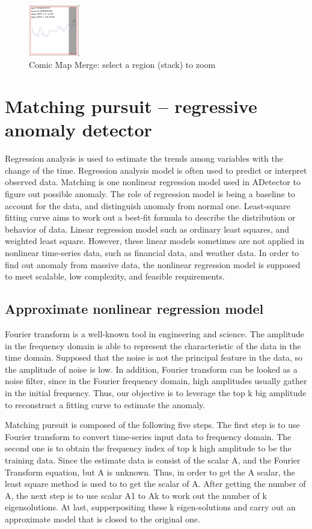 \documentclass{vgtc}                          %
\begin{document}
 \begin{figure}[htb]
	\centering
  \includegraphics[width=0.20\textwidth]{zoom.jpg}
  \caption{Comic Map Merge: select a region (stack) to zoom}
\end{figure}

\section{Matching pursuit -- regressive anomaly detector}

Regression analysis is used to estimate the trends among variables with the change of the time. Regression analysis model is often used to predict or interpret observed data. Matching is one nonlinear regression model used in ADetector to figure out possible anomaly. The role of regression model is being a baseline to account for the data, and distinguish anomaly from normal one. Least-square fitting curve aims to work out a best-fit formula to describe the distribution or behavior of data. Linear regression model such as ordinary least squares, and weighted least square. However, these linear models sometimes are not applied in nonlinear time-series data, such as financial data, and weather data. In order to find out anomaly from massive data, the nonlinear regression model is supposed to meet scalable, low complexity, and feasible requirements.

\subsection{Approximate nonlinear regression model}

Fourier transform is a well-known tool in engineering and science. The amplitude in the frequency domain is able to represent the characteristic of the data in the time domain. Supposed that the noise is not the principal feature in the data, so the amplitude of noise is low. In addition, Fourier transform can be looked as a noise filter, since in the Fourier frequency domain, high amplitudes usually gather in the initial frequency. Thus, our objective is to leverage the top k big amplitude to reconstruct a fitting curve to estimate the anomaly. 

Matching pursuit is composed of the following five steps. The first step is to use Fourier transform to convert time-series input data to frequency domain. The second one is to obtain the frequency index of top k high amplitude to be the training data. Since the estimate data is consist of the scalar A, and the Fourier Transform equation, but A is unknown. Thus, in order to get the A scalar, the least square method is used to to get the scalar of A. After getting the number of A, the next step is to use scalar A1 to Ak to work out the number of k eigensolutions. At last, supperpositing these k eigen-solutions and carry out an approximate model that is closed to the original one.
\end{document}
